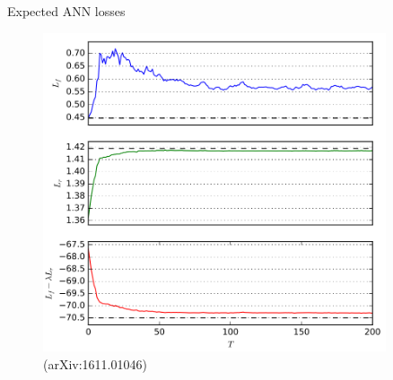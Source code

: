 \begin{frame}{Expected ANN losses}
    \begin{figure}
        \centering
        \includegraphics[width=0.9\textwidth]{figures_theory/losses_paper}
        \caption{(arXiv:1611.01046)}
    \end{figure}
\end{frame}